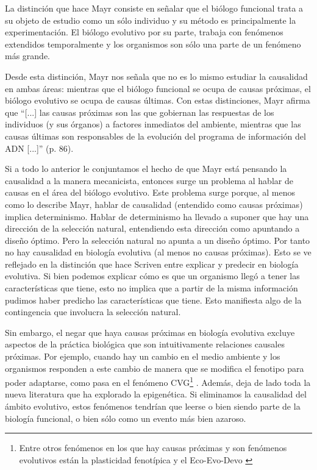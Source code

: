 La distinción que hace Mayr consiste en señalar que el biólogo funcional trata a su objeto de estudio como un sólo individuo y su método es principalmente la experimentación. El biólogo evolutivo por su parte, trabaja con fenómenos extendidos temporalmente y los organismos son sólo una parte de un fenómeno más grande.

Desde esta distinción, Mayr nos señala que no es lo mismo estudiar la causalidad en ambas áreas: mientras que el biólogo funcional se ocupa de causas próximas, el biólogo evolutivo se ocupa de causas últimas. Con estas distinciones, Mayr afirma que ``[...] las causas próximas son las que gobiernan las respuestas de los individuos (y sus órganos) a factores inmediatos del ambiente, mientras que las causas últimas son responsables de la evolución del programa de información del ADN [...]'' (p. 86).

Si a todo lo anterior le conjuntamos el hecho de que Mayr está pensando la causalidad a la manera mecanicista, entonces surge un problema al hablar de causas en el área del biólogo evolutivo. Este problema surge porque, al menos como lo describe Mayr, hablar de causalidad (entendido como causas próximas) implica determinismo. Hablar de determinismo ha llevado a suponer que hay una dirección de la selección natural, entendiendo esta dirección como apuntando a diseño óptimo. Pero la selección natural no apunta a un diseño óptimo. Por tanto no hay causalidad en biología evolutiva (al menos no causas próximas). Esto se ve reflejado en la distinción que hace Scriven \citeyear{Scriven1959} entre explicar y predecir en biología evolutiva. Si bien podemos explicar cómo es que un organismo llegó a tener las características que tiene, esto no implica que a partir de la misma información pudimos haber predicho las características que tiene. Esto manifiesta algo de la contingencia que involucra la selección natural.

Sin embargo, el negar que haya causas próximas en biología evolutiva excluye aspectos de la práctica biológica que son intuitivamente relaciones causales próximas. Por ejemplo, cuando hay un cambio en el medio ambiente y los organismos responden a este cambio de manera que se modifica el fenotipo para poder adaptarse, como pasa en el fenómeno CVG\footnote{Entre otros fenómenos en los que hay causas próximas y son fenómenos evolutivos están la plasticidad fenotípica \cite{WESTEBERHARD20082701} y el Eco-Evo-Devo \cite{PfenningEco-Evo-Devo}} \cite{CVG}. Además, deja de lado toda la nueva literatura que ha explorado la epigenética. Si eliminamos la causalidad del ámbito evolutivo, estos fenómenos tendrían que leerse o bien siendo parte de la biología funcional, o bien sólo como un evento más bien azaroso.

